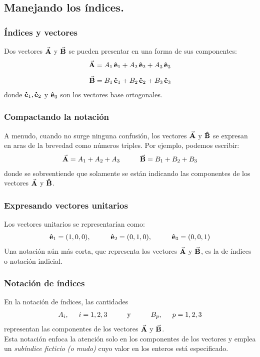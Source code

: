 \documentclass[12pt]{beamer}
\begin{document}
\subsection{Manejando los índices.}
\begin{frame}
\frametitle{Índices y vectores}
Dos vectores $\va{A}$ y $\va{B}$ se pueden presentar en una forma de sus componentes:
\begin{align*}
\va{A} &= A_{1} \, \vu{e}_{1} + A_{2} \, \vu{e}_{2} + A_{3} \, \vu{e}_{3} \\[0.5em]
\va{B} &= B_{1} \, \vu{e}_{1} + B_{2} \, \vu{e}_{2} + B_{3} \, \vu{e}_{3}
\end{align*}
donde $\vu{e}_{1}, \vu{e}_{2}$ y $\vu{e}_{3}$ son los vectores base ortogonales.
\end{frame}
\begin{frame}
\frametitle{Compactando la notación}
A menudo, cuando no surge ninguna confusión, los vectores $\va{A}$ y $\vu{B}$ se expresan en aras de la brevedad como números triples. Por ejemplo, podemos escribir:
\begin{align*}
\va{A} = A_{1} + A_{2} + A_{3} \hspace{1cm} \va{B} = B_{1} + B_{2} + B_{3}
\end{align*}
donde se sobreentiende que solamente se están indicando las componentes de los vectores $\va{A}$ y $\vu{B}$.
\end{frame}
\begin{frame}
\frametitle{Expresando vectores unitarios}
Los vectores unitarios se representarían como:
\begin{align*}
\vu{e}_{1} = (1, 0, 0), \hspace{1cm} \vu{e}_{2} = (0, 1, 0), \hspace{1cm} \vu{e}_{3} = (0, 0, 1)
\end{align*}
Una notación aún más corta, que representa los vectores $\va{A}$ y $\va{B}$, es la de índices o notación indicial.
\end{frame}
\begin{frame}
\frametitle{Notación de índices}
En la notación de índices, las cantidades
\begin{align*}
A_{i}, \hspace{0.5cm} i = 1, 2, 3 \hspace{1cm} \mbox{y} \hspace{1cm} B_{p}, \hspace{0.5cm} p = 1, 2, 3
\end{align*}
representan las componentes de los vectores $\va{A}$ y $\va{B}$.
\\
\bigskip
\pause
Esta notación enfoca la atención solo en los componentes de los vectores y emplea un \emph{subíndice ficticio (o mudo)} cuyo valor en los enteros está especificado.
\end{frame}
\end{document}
